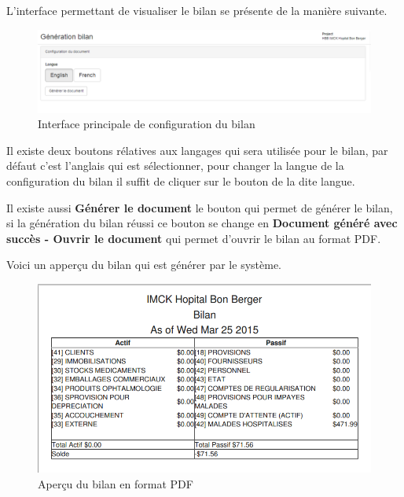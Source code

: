\documentclass[12pt,a4paper]{report}
\begin{document}
L'interface permettant de visualiser le bilan se présente de la manière suivante.

\begin{figure}[h]
\begin{center}
\includegraphics[width=14cm]{pic/confBilan.png}
\end{center}
\caption{Interface principale de configuration du bilan}
\label{Interface principale de configuration du bilan}
\end{figure}

Il existe deux boutons rélatives aux langages qui sera utilisée pour le bilan, par défaut c'est l'anglais qui est sélectionner, pour changer la langue de la configuration du bilan il suffit de cliquer sur le bouton de la dite langue.

Il existe aussi \textbf{Générer le document} le bouton qui permet de générer le bilan, si la génération du bilan  réussi ce bouton se change en \textbf{Document généré avec succès - Ouvrir le document} qui permet d'ouvrir le bilan au format PDF.

Voici un apperçu du bilan qui est générer par le système.
 
\begin{figure}[h]
\begin{center}
\includegraphics[width=14cm]{pic/bilanOverView.png}
\end{center}
\caption{Aperçu du bilan en format PDF}
\label{Aperçu du bilan en format PDF}
\end{figure}
\end{document}

